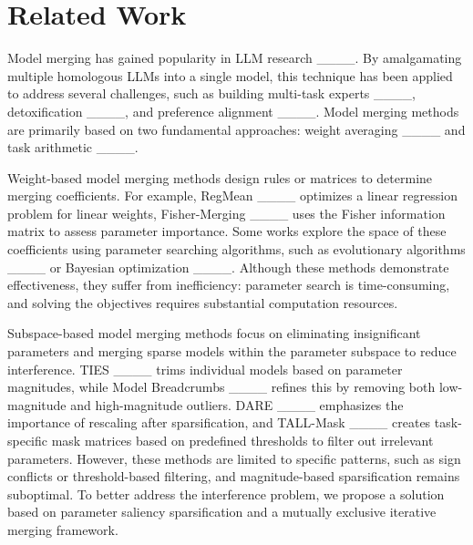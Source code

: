\section{Related Work}
Model merging has gained popularity in LLM research ____. By amalgamating multiple homologous LLMs into a single model, this technique has been applied to address several challenges, such as building multi-task experts ____, detoxification ____, and preference alignment ____. Model merging methods are primarily based on two fundamental approaches: weight averaging ____ and task arithmetic ____. 

Weight-based model merging methods design rules or matrices to determine merging coefficients. For example, RegMean ____ optimizes a linear regression problem for linear weights, Fisher-Merging ____ uses the Fisher information matrix to assess parameter importance. Some works explore the space of these coefficients using parameter searching algorithms, such as evolutionary algorithms ____ or Bayesian optimization ____. Although these methods demonstrate effectiveness, they suffer from inefficiency: parameter search is time-consuming, and solving the objectives requires substantial computation resources. 

Subspace-based model merging methods focus on eliminating insignificant parameters and merging sparse models within the parameter subspace to reduce interference. TIES ____ trims individual models based on parameter magnitudes, while Model Breadcrumbs ____ refines this by removing both low-magnitude and high-magnitude outliers. DARE ____ emphasizes the importance of rescaling after sparsification, and TALL-Mask ____ creates task-specific mask matrices based on predefined thresholds to filter out irrelevant parameters. However, these methods are limited to specific patterns, such as sign conflicts or threshold-based filtering, and magnitude-based sparsification remains suboptimal. To better address the interference problem, we propose a solution based on parameter saliency sparsification and a mutually exclusive iterative merging framework.